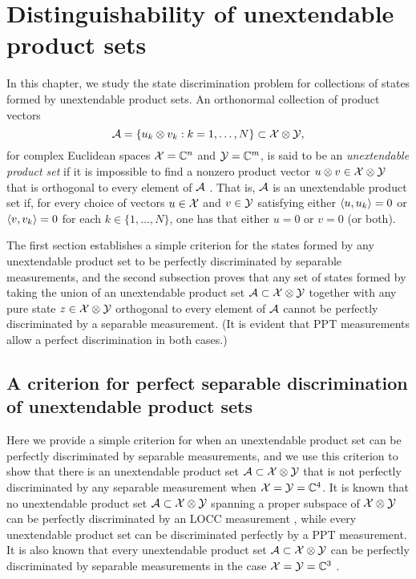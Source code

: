 \chapter{Distinguishability of unextendable product sets}
\label{chap:ups}

In this chapter, we study the state discrimination problem for collections of
states formed by unextendable product sets.
An orthonormal collection of product vectors
\begin{equation}
  \mathcal{A} = \{ u_{k}\otimes v_{k} : k = 1, \ldots, N \} \subset \mathcal{X} \otimes \mathcal{Y},
\end{equation}
for complex Euclidean spaces $\mathcal{X}=\mathbb{C}^n$ and $\mathcal{Y}=\mathbb{C}^m$, is said to be
an \emph{unextendable product set} if it is impossible to find a nonzero
product vector $u \otimes v \in \mathcal{X} \otimes \mathcal{Y}$ that is orthogonal to every
element of $\mathcal{A}$ \cite{Bennett99}.
That is, $\mathcal{A}$ is an unextendable product set if, for every choice of vectors
$u\in\mathcal{X}$ and $v\in\mathcal{Y}$ satisfying either $\langle u , u_{k}\rangle = 0$ or 
$\langle v , v_{k}\rangle = 0$ for each $k\in\{1,\ldots,N\}$, one has that either $u = 0$
or $v = 0$ (or both).

The first section establishes a simple criterion for the states formed by
any unextendable product set to be perfectly discriminated by separable
measurements, and the second subsection proves that any set of states formed
by taking the union of an unextendable product set $\mathcal{A} \subset \mathcal{X} \otimes \mathcal{Y}$ 
together with any pure state $z \in \mathcal{X}\otimes\mathcal{Y}$ orthogonal to every element of
$\mathcal{A}$ cannot be perfectly discriminated by a separable measurement.
(It is evident that PPT measurements allow a perfect discrimination in both
cases.)

\minitoc

\section{A criterion for perfect separable discrimination of
unextendable product sets}

Here we provide a simple criterion for when an unextendable product set can be
perfectly discriminated by separable measurements, and we use this criterion to
show that there is an unextendable product set $\mathcal{A} \subset \mathcal{X}\otimes\mathcal{Y}$ that is
not perfectly discriminated by any separable measurement when
$\mathcal{X} = \mathcal{Y} = \mathbb{C}^4$.
It is known that no unextendable product set $\mathcal{A} \subset \mathcal{X}\otimes\mathcal{Y}$
spanning a proper subspace of $\mathcal{X}\otimes\mathcal{Y}$ can be perfectly discriminated by
an LOCC measurement \cite{Bennett99}, while every unextendable product
set can be discriminated perfectly by a PPT measurement.
It is also known that every unextendable product set $\mathcal{A}\subset\mathcal{X}\otimes\mathcal{Y}$ can
be perfectly discriminated by separable measurements in the case 
$\mathcal{X} = \mathcal{Y} = \mathbb{C}^3$ \cite{DiVincenzo03}.

